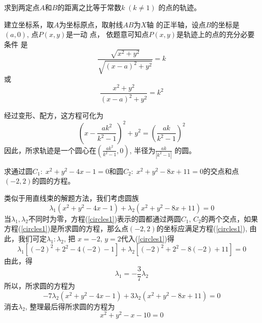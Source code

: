 \begin{example}
    求到两定点$A$和$B$的距离之比等于常数$k\; (k\ne 1)$
的点的轨迹。
\end{example}

\begin{figure}[htp]
    \centering
{}
    \caption{}
\end{figure}

\begin{solution}
    建立坐标系，取$A$为坐标原点，取射线$AB$为$X$轴
的正半轴，设点$B$的坐标是$(a,0)$, 点$P(x,y)$是一动
点，
依题意可知点$P(x,y)$是轨迹上的点的充分必要条件
是
\[\frac{\sqrt{x^2+y^2}}{\sqrt{(x-a)^2+y^2}}=k\]
或
\[\frac{{x^2+y^2}}{{(x-a)^2+y^2}}=k^2\]

经过变形、配方，这方程可化为
\[\left(x-\frac{ak^2}{k^2-1}\right)^2+y^2=\left(\frac{ak}{k^2-1}\right)^2\]
因此，所求轨迹是一个圆心在$\left(\frac{ak^2}{k^2-1},0\right)$,
半径为$\frac{ak}{|k^2-1|}$
的圆。
\end{solution}

\begin{example}
    求通过圆$C_1:\; x^2+y^2-4x-1=0$和圆$C_2:\; x^2+
y^2-8x+11=0$的交点和点$(-2,2)$的圆的方程。
\end{example}

\begin{solution}
类似于用直线束的解题方法，我们考虑圆族
\begin{equation}\label{circles1}
    \lambda_1(x^2+y^2-4x-1)+\lambda_2(x^2+y^2-8x+11)=0
\end{equation}
当$\lambda_1,\lambda_2$不同时为零，方程(\ref{circles1})表示的圆都通过两圆$C_1$, 
$C_2$的两个交点，如果方程(\ref{circles1})是所求圆的方程，那么点$(-2,2)$的坐标应满足方程(\ref{circles1}), 由此，我们可定$\lambda_1:\lambda_2$, 把
$x=-2$, $y=2$代入(\ref{circles1})得
\[\lambda_1[(-2)^2+2^2-4(-2)-1]+\lambda_2[(-2)^2+2^2-8(-2)+11]=0\]
由此，得
\[\lambda_1=-\frac{3}{7}\lambda_2\]
所以，所求圆的方程为
\[-7\lambda_2(x^2+y^2-4x-1)+3\lambda_2(x^2+y^2-8x+11)=0\]
消去$\lambda_2$, 整理最后得所求圆的方程为
\[x^2+y^2-x-10=0\]
\end{solution}

